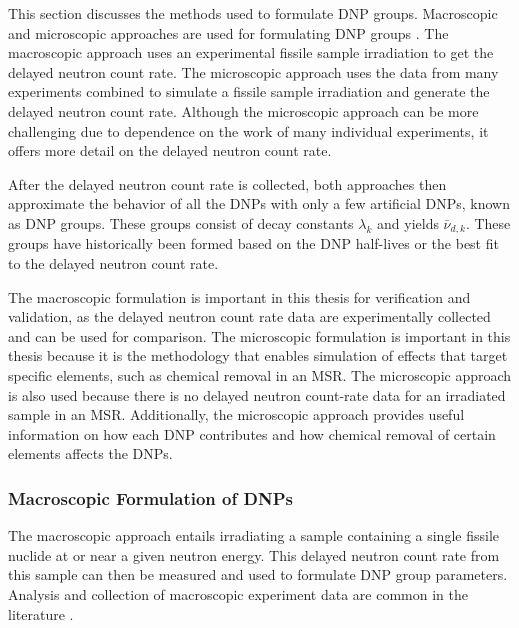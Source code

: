This section discusses the methods used to formulate \gls{DNP} groups.
Macroscopic and microscopic approaches are used for formulating \gls{DNP} groups \cite{parish1999status, rudstam2002delayed}.
The macroscopic approach uses an experimental fissile sample irradiation to get the delayed neutron count rate.
The microscopic approach uses the data from many experiments combined to simulate a fissile sample irradiation and generate the delayed neutron count rate.
Although the microscopic approach can be more challenging due to dependence on the work of many individual experiments, it offers more detail on the delayed neutron count rate.

After the delayed neutron count rate is collected, both approaches then approximate the behavior of all the \glspl{DNP} with only a few artificial \glspl{DNP}, known as \gls{DNP} groups.
These groups consist of decay constants $\lambda_k$ and yields $\bar{\nu}_{d, k}$.
These groups have historically been formed based on the \gls{DNP} half-lives or the best fit to the delayed neutron count rate.

The macroscopic formulation is important in this thesis for verification and validation, as the delayed neutron count rate data are experimentally collected and can be used for comparison.
The microscopic formulation is important in this thesis because it is the methodology that enables simulation of effects that target specific elements, such as chemical removal in an \gls{MSR}.
The microscopic approach is also used because there is no delayed neutron count-rate data for an irradiated sample in an \gls{MSR}.
Additionally, the microscopic approach provides useful information on how each \gls{DNP} contributes and how chemical removal of certain elements affects the \glspl{DNP}.

\subsubsection{Macroscopic Formulation of DNPs}
\label{sec:macro-eval}
The macroscopic approach entails irradiating a sample containing a single fissile nuclide at or near a given neutron energy.
This delayed neutron count rate from this sample can then be measured and used to formulate \gls{DNP} group parameters.
Analysis and collection of macroscopic experiment data are common in the literature \cite{keepin1957delayed, tuttle1975delayed, manero1972status, benedetti1982delayed, waldo1981delayed, brady1988evaluation, hughes1948delayed, loaiza1998measurements, loaiza2000dominant, conant1971measurement, seifert2025delayed}.

